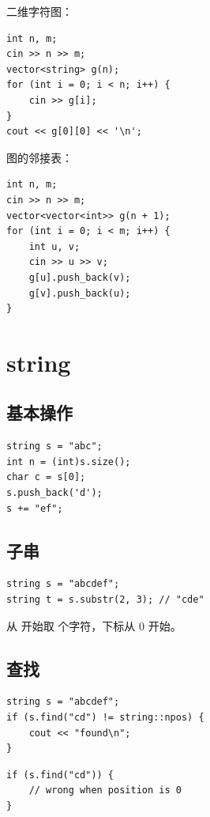 二维字符图：

\begin{lstlisting}
int n, m;
cin >> n >> m;
vector<string> g(n);
for (int i = 0; i < n; i++) {
    cin >> g[i];
}
cout << g[0][0] << '\n';
\end{lstlisting}

图的邻接表：

\begin{lstlisting}
int n, m;
cin >> n >> m;
vector<vector<int>> g(n + 1);
for (int i = 0; i < m; i++) {
    int u, v;
    cin >> u >> v;
    g[u].push_back(v);
    g[v].push_back(u);
}
\end{lstlisting}

\section{string}\label{sec:04-12}

\subsection{基本操作}

\begin{lstlisting}
string s = "abc";
int n = (int)s.size();
char c = s[0];
s.push_back('d');
s += "ef";
\end{lstlisting}

\subsection{子串}

\begin{lstlisting}
string s = "abcdef";
string t = s.substr(2, 3); // "cde"
\end{lstlisting}

 从  开始取  个字符，下标从 0 开始。

\subsection{查找}

\begin{lstlisting}
string s = "abcdef";
if (s.find("cd") != string::npos) {
    cout << "found\n";
}
\end{lstlisting}


\begin{lstlisting}
if (s.find("cd")) {
    // wrong when position is 0
}
\end{lstlisting}


